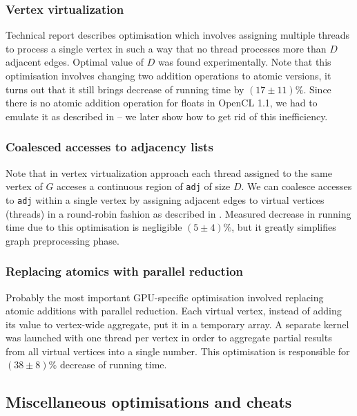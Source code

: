 \subsubsection*{Vertex virtualization}

Technical report \cite{BcGpu} describes optimisation which involves assigning multiple threads to process a single vertex in such a way that no thread processes more than $D$ adjacent edges.
Optimal value of $D$ was found experimentally.
Note that this optimisation involves changing two addition operations to atomic versions, it turns out that it still brings decrease of running time by $(17 \pm 11) \%$.
Since there is no atomic addition operation for floats in OpenCL 1.1, we had to emulate it as described in \cite{AtomAddF} -- we later show how to get rid of this inefficiency.

\subsubsection*{Coalesced accesses to adjacency lists}

Note that in vertex virtualization approach each thread assigned to the same vertex of $G$ acceses a continuous region of \verb+adj+ of size $D$.
We can coalesce accesses to \verb+adj+ within a single vertex by assigning adjacent edges to virtual vertices (threads) in a round-robin fashion as described in \cite{BcGpu}.
Measured decrease in running time due to this optimisation is negligible $(5 \pm 4) \%$, but it greatly simplifies graph preprocessing phase.

\subsubsection*{Replacing atomics with parallel reduction}

Probably the most important GPU-specific optimisation involved replacing atomic additions with parallel reduction.
Each virtual vertex, instead of adding its value to vertex-wide aggregate, put it in a temporary array.
A separate kernel was launched with one thread per vertex in order to aggregate partial results from all virtual vertices into a single number.
This optimisation is responsible for $(38 \pm 8) \%$ decrease of running time.

\subsection*{Miscellaneous optimisations and cheats}


